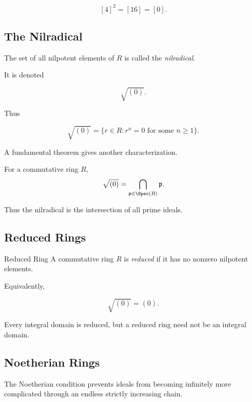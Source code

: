 \[ [4]^2=[16]=[0]. \]

\subsection{The Nilradical}
\label{subsec:nilradical}

The set of all nilpotent elements of \(R\) is called the
\emph{nilradical}.

It is denoted

\[ \sqrt{(0)}. \]

Thus

\[ \sqrt{(0)}=\{r\in R:r^n=0\text{ for some }n\geq1\}. \]

A fundamental theorem gives another characterization.

\begin{theorem}
For a commutative ring \(R\),
\[ \sqrt{(0)}=\bigcap_{\mathfrak p\in\Spec(R)}\mathfrak p. \]
\end{theorem}

Thus the nilradical is the intersection of all prime ideals.

\subsection{Reduced Rings}
\label{subsec:reduced-rings}

\begin{definitionbox}{Reduced Ring}
A commutative ring \(R\) is \emph{reduced} if it has no nonzero nilpotent
elements.
\end{definitionbox}

Equivalently,

\[ \sqrt{(0)}=(0). \]

Every integral domain is reduced, but a reduced ring need not be an integral
domain.

\subsection{Noetherian Rings}
\label{subsec:noetherian-rings}

The Noetherian condition prevents ideals from becoming infinitely more
complicated through an endless strictly increasing chain.


